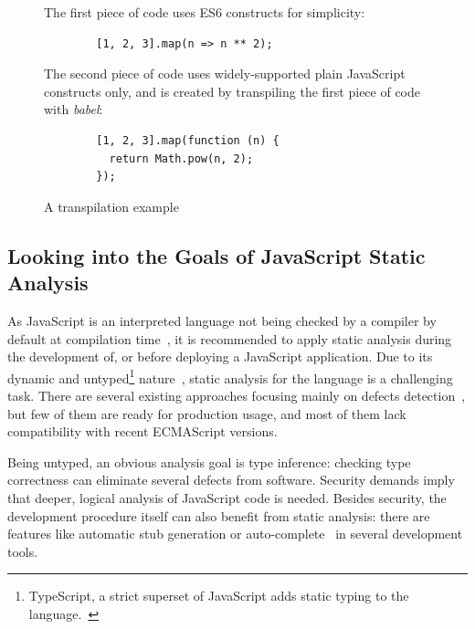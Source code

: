 \vspace{1em}
\begin{figure}[!htb]
	\centering
	\begin{minipage}{25em}
		The first piece of code uses ES6 constructs for simplicity:

		\begin{verbatim}
		[1, 2, 3].map(n => n ** 2);
		\end{verbatim}

		The second piece of code uses widely-supported plain JavaScript constructs only, and is created by transpiling the first piece of code with \emph{babel}:

		\begin{verbatim}
		[1, 2, 3].map(function (n) {
		  return Math.pow(n, 2);
		});
		\end{verbatim}
	\end{minipage}
  \caption{A transpilation example}
  \label{fig:transpiling-example}
\end{figure}


\subsection{Looking into the Goals of JavaScript Static Analysis}

As JavaScript is an interpreted language not being checked by a compiler by default at compilation time~\cite{373902}, it is recommended to apply static analysis during the development of, or before deploying a JavaScript application. Due to its dynamic and untyped\footnote{TypeScript, a strict superset of JavaScript adds static typing to the language.~\cite{typescript-website}} nature~\cite{flanagan2006javascript}, static analysis for the language is a challenging task. There are several existing approaches focusing mainly on defects detection~\cite{madsen2013practical, livshits2010gulfstream, jensen2009type}, but few of them are ready for production usage, and most of them lack compatibility with recent ECMAScript versions.

Being untyped, an obvious analysis goal is type inference: checking type correctness can eliminate several defects from software. Security demands imply that deeper, logical analysis of JavaScript code is needed. Besides security, the development procedure itself can also benefit from static analysis: there are features like automatic stub generation or auto-complete~\cite{madsen2013practical} in several development tools.~\cite{esprima-autocomplete, webstorm-autocomplete}


